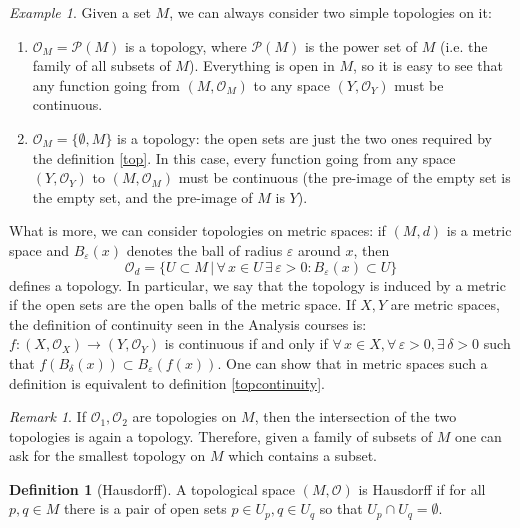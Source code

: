 \documentclass[a4paper,11pt,titlepage]{article}
\numberwithin{equation}{section}
\theoremstyle{definition}
\newtheorem{definition}[theorem]{Definition}
\theoremstyle{remark}
\newtheorem{remark}[theorem]{Remark}
\newtheorem{example}[theorem]{Example}
\begin{document}
\begin{example}
Given a set $M$, we can always consider two simple topologies on it:
\begin{enumerate}
	\item $\mathcal{O}_M =  \mathcal{P}(M)$ is a topology, where $\mathcal{P}(M)$ is the power set of $M$ (i.e. the family of all subsets of $M$). Everything is open in $M$, so it is easy to see that any function going from $(M, \mathcal{O}_M)$ to any space $(Y, \mathcal{O}_Y)$ must be continuous.
	\item $\mathcal{O}_M=\{\emptyset, M\}$ is a topology: the open sets are just the two ones required by the definition \ref{top}. In this case, every function going from any space $(Y, \mathcal{O}_Y)$ to $(M, \mathcal{O}_M)$ must be continuous (the pre-image of the empty set is the empty set, and the pre-image of $M$ is $Y$).
\end{enumerate}
What is more, we can consider topologies on metric spaces: if $(M, d)$ is a metric space and $B_{\varepsilon}(x)$ denotes the ball of radius $\varepsilon$ around $x$, then 
$$\mathcal{O}_d = \{U \subset M \, | \, \forall\, x \in U \, \exists\, \varepsilon > 0 \colon B_{\varepsilon}(x) \subset U \}$$
defines a topology. In particular, we say that the topology is induced by a metric if the open sets are the open balls of the metric space. If $X, Y$ are metric spaces, the definition of continuity seen in the Analysis courses is: $f \colon (X, \mathcal{O}_X) \rightarrow (Y, \mathcal{O}_Y)$ is continuous if and only if $\forall \, x \in X, \forall \, \varepsilon > 0, \exists \, \delta > 0$ such that $f\left(B_{\delta}(x)\right) \subset B_{\varepsilon}\left(f(x)\right)$. One can show that in metric spaces such a definition is equivalent to definition \ref{topcontinuity}.
\end{example}

\begin{remark}
If $\mathcal{O}_1, \mathcal{O}_2$ are topologies on $M$, then the intersection of the two topologies is again a topology. Therefore, given a family of subsets of $M$ one can ask for the smallest topology on $M$ which contains a subset.
\end{remark}

\begin{definition}[Hausdorff]
A topological space $(M, \mathcal{O})$ is Hausdorff if for all $p, q \in M$ there is a pair of open sets $p \in U_p, q \in U_q$ so that $U_p \cap U_q = \emptyset$.
\end{definition}
\end{document}
